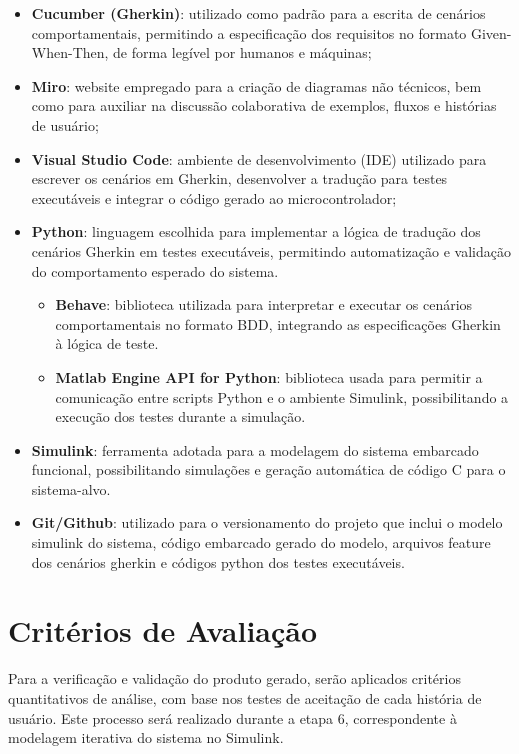 \begin{itemize}
    \item \textbf{Cucumber (Gherkin)}: utilizado como padrão para a escrita de cenários comportamentais, permitindo a especificação dos requisitos no formato Given-When-Then, de forma legível por humanos e máquinas;
    \item \textbf{Miro}: website empregado para a criação de diagramas não técnicos, bem como para auxiliar na discussão colaborativa de exemplos, fluxos e histórias de usuário;
    \item \textbf{Visual Studio Code}: ambiente de desenvolvimento (IDE) utilizado para escrever os cenários em Gherkin, desenvolver a tradução para testes executáveis e integrar o código gerado ao microcontrolador;
    \item \textbf{Python}: linguagem escolhida para implementar a lógica de tradução dos cenários Gherkin em testes executáveis, permitindo automatização e validação do comportamento esperado do sistema.
    \begin{itemize}
        \item \textbf{Behave}: biblioteca utilizada para interpretar e executar os cenários comportamentais no formato BDD, integrando as especificações Gherkin à lógica de teste.
        \item \textbf{Matlab Engine API for Python}: biblioteca usada para permitir a comunicação entre scripts Python e o ambiente Simulink, possibilitando a execução dos testes durante a simulação.
    \end{itemize}    
    \item \textbf{Simulink}: ferramenta adotada para a modelagem do sistema embarcado funcional, possibilitando simulações e geração automática de código C para o sistema-alvo.
    \item \textbf{Git/Github}: utilizado para o versionamento do projeto que inclui o modelo simulink do sistema, código embarcado gerado do modelo, arquivos feature dos cenários gherkin e códigos python dos testes executáveis.

\end{itemize}

\section{\textbf{Critérios de Avaliação}}
Para a verificação e validação do produto gerado, serão aplicados critérios quantitativos de análise, com base nos testes de aceitação de cada história de usuário. Este 
processo será realizado durante a etapa 6, correspondente à modelagem iterativa do sistema no Simulink.

